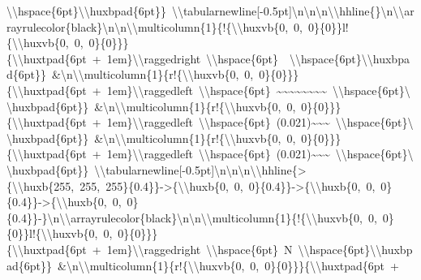 \documentclass[
  english,
  man]{apa6}
\begin{document}
\textbackslash{}\textbackslash{}hspace\{6pt\}\textbackslash{}\textbackslash{}huxbpad\{6pt\}\}\ \textbackslash{}\textbackslash{}tabularnewline{[}-0.5pt{]}\textbackslash{}n\textbackslash{}n\textbackslash{}n\textbackslash{}\textbackslash{}hhline\{\}\textbackslash{}n\textbackslash{}\textbackslash{}arrayrulecolor\{black\}\textbackslash{}n\textbackslash{}n\textbackslash{}\textbackslash{}multicolumn\{1\}\{!\{\textbackslash{}\textbackslash{}huxvb\{0,\ 0,\ 0\}\{0\}\}l!\{\textbackslash{}\textbackslash{}huxvb\{0,\ 0,\ 0\}\{0\}\}\}\{\textbackslash{}\textbackslash{}huxtpad\{6pt\ +\ 1em\}\textbackslash{}\textbackslash{}raggedright\ \textbackslash{}\textbackslash{}hspace\{6pt\}\ \ \textbackslash{}\textbackslash{}hspace\{6pt\}\textbackslash{}\textbackslash{}huxbpad\{6pt\}\}\ \&\textbackslash{}n\textbackslash{}\textbackslash{}multicolumn\{1\}\{r!\{\textbackslash{}\textbackslash{}huxvb\{0,\ 0,\ 0\}\{0\}\}\}\{\textbackslash{}\textbackslash{}huxtpad\{6pt\ +\ 1em\}\textbackslash{}\textbackslash{}raggedleft\ \textbackslash{}\textbackslash{}hspace\{6pt\}\ \textasciitilde{}\textasciitilde{}\textasciitilde{}\textasciitilde{}\textasciitilde{}\textasciitilde{}\textasciitilde{}\textasciitilde{}\ \textbackslash{}\textbackslash{}hspace\{6pt\}\textbackslash{}\textbackslash{}huxbpad\{6pt\}\}\ \&\textbackslash{}n\textbackslash{}\textbackslash{}multicolumn\{1\}\{r!\{\textbackslash{}\textbackslash{}huxvb\{0,\ 0,\ 0\}\{0\}\}\}\{\textbackslash{}\textbackslash{}huxtpad\{6pt\ +\ 1em\}\textbackslash{}\textbackslash{}raggedleft\ \textbackslash{}\textbackslash{}hspace\{6pt\}\ (0.021)\textasciitilde{}\textasciitilde{}\textasciitilde{}\ \textbackslash{}\textbackslash{}hspace\{6pt\}\textbackslash{}\textbackslash{}huxbpad\{6pt\}\}\ \&\textbackslash{}n\textbackslash{}\textbackslash{}multicolumn\{1\}\{r!\{\textbackslash{}\textbackslash{}huxvb\{0,\ 0,\ 0\}\{0\}\}\}\{\textbackslash{}\textbackslash{}huxtpad\{6pt\ +\ 1em\}\textbackslash{}\textbackslash{}raggedleft\ \textbackslash{}\textbackslash{}hspace\{6pt\}\ (0.021)\textasciitilde{}\textasciitilde{}\textasciitilde{}\ \textbackslash{}\textbackslash{}hspace\{6pt\}\textbackslash{}\textbackslash{}huxbpad\{6pt\}\}\ \textbackslash{}\textbackslash{}tabularnewline{[}-0.5pt{]}\textbackslash{}n\textbackslash{}n\textbackslash{}n\textbackslash{}\textbackslash{}hhline\{\textgreater{}\{\textbackslash{}\textbackslash{}huxb\{255,\ 255,\ 255\}\{0.4\}\}-\textgreater{}\{\textbackslash{}\textbackslash{}huxb\{0,\ 0,\ 0\}\{0.4\}\}-\textgreater{}\{\textbackslash{}\textbackslash{}huxb\{0,\ 0,\ 0\}\{0.4\}\}-\textgreater{}\{\textbackslash{}\textbackslash{}huxb\{0,\ 0,\ 0\}\{0.4\}\}-\}\textbackslash{}n\textbackslash{}\textbackslash{}arrayrulecolor\{black\}\textbackslash{}n\textbackslash{}n\textbackslash{}\textbackslash{}multicolumn\{1\}\{!\{\textbackslash{}\textbackslash{}huxvb\{0,\ 0,\ 0\}\{0\}\}l!\{\textbackslash{}\textbackslash{}huxvb\{0,\ 0,\ 0\}\{0\}\}\}\{\textbackslash{}\textbackslash{}huxtpad\{6pt\ +\ 1em\}\textbackslash{}\textbackslash{}raggedright\ \textbackslash{}\textbackslash{}hspace\{6pt\}\ N\ \textbackslash{}\textbackslash{}hspace\{6pt\}\textbackslash{}\textbackslash{}huxbpad\{6pt\}\}\ \&\textbackslash{}n\textbackslash{}\textbackslash{}multicolumn\{1\}\{r!\{\textbackslash{}\textbackslash{}huxvb\{0,\ 0,\ 0\}\{0\}\}\}\{\textbackslash{}\textbackslash{}huxtpad\{6pt\ +\ 
\end{document}
